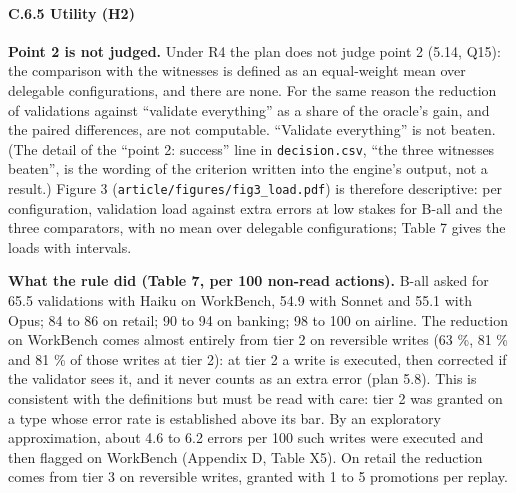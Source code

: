 \paragraph{C.6.5 Utility (H2)}\label{c.6.5-utility-h2}

\textbf{Point 2 is not judged.} Under R4 the plan does not judge point 2 (5.14, Q15): the comparison with the witnesses is defined as an equal-weight mean over delegable configurations, and there are none. For the same reason the reduction of validations against ``validate everything'' as a share of the oracle's gain, and the paired differences, are not computable. ``Validate everything'' is not beaten. (The detail of the ``point 2: success'' line in \texttt{decision.\allowbreak{}csv}, ``the three witnesses beaten'', is the wording of the criterion written into the engine's output, not a result.) Figure 3 (\texttt{article/\allowbreak{}figures/\allowbreak{}fig3\_\allowbreak{}load.\allowbreak{}pdf}) is therefore descriptive: per configuration, validation load against extra errors at low stakes for B-all and the three comparators, with no mean over delegable configurations; Table 7 gives the loads with intervals.

\textbf{What the rule did (Table 7, per 100 non-read actions).} B-all asked for 65.5 validations with Haiku on WorkBench, 54.9 with Sonnet and 55.1 with Opus; 84 to 86 on retail; 90 to 94 on banking; 98 to 100 on airline. The reduction on WorkBench comes almost entirely from tier 2 on reversible writes (63 \%, 81 \% and 81 \% of those writes at tier 2): at tier 2 a write is executed, then corrected if the validator sees it, and it never counts as an extra error (plan 5.8). This is consistent with the definitions but must be read with care: tier 2 was granted on a type whose error rate is established above its bar. By an exploratory approximation, about 4.6 to 6.2 errors per 100 such writes were executed and then flagged on WorkBench (Appendix D, Table X5). On retail the reduction comes from tier 3 on reversible writes, granted with 1 to 5 promotions per replay.

